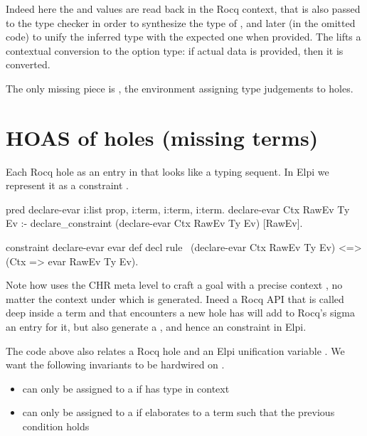 \documentclass[a4paper, 11pt]{book}
\begin{document}
Indeed here the  and  values
are read back in the  Rocq context,
that is also passed to the type checker in order to synthesize the
type of , and later (in the omitted code) to unify
the inferred type with the expected one  when provided.
The  lifts a contextual conversion to the option
type: if actual data is provided, then it is converted.

The only missing piece is , the environment assigning
type judgements to holes.

\section{HOAS of holes (missing terms)}

Each Rocq hole as an entry in  that looks like a
typing sequent. In Elpi we represent it as a constraint .

\begin{elpicode}
pred declare-evar i:list prop, i:term, i:term, i:term. %
declare-evar Ctx RawEv Ty Ev :-
  declare_constraint (declare-evar Ctx RawEv Ty Ev) [RawEv].

constraint declare-evar evar def decl {
  rule \ (declare-evar Ctx RawEv Ty Ev) <=> (Ctx => evar RawEv Ty Ev).
}
\end{elpicode}

Note how  uses the CHR meta level to craft
a goal with a precise context , no matter the context
under which  is generated. Ineed a Rocq API
that is called deep inside a term and that encounters a new hole has
will add to Rocq's sigma an entry for it, but also generate a
, and hence an  constraint
in Elpi.

The code above also relates a Rocq hole  and an
Elpi unification variable . We want the following
invariants to be hardwired on .

\begin{itemize}
  \item {} can only be assigned to a  if
         has type  in context 
  \item {} can only be assigned to a  if
         elaborates to a term  such that
        the previous condition holds
\end{itemize}
\end{document}
